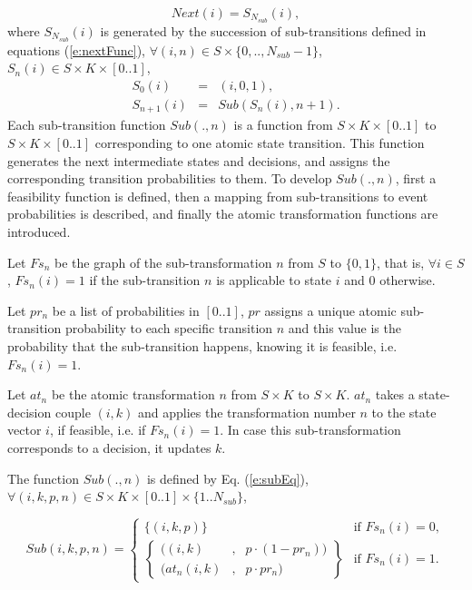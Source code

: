 \documentclass[letterpaper]{article}
\begin{document}
\begin{equation} \label{e:nextFunc0}
Next(i) = S_{N_{sub}}(i),
\end{equation}
where $S_{N_{sub}}(i)$ is generated by the succession of sub-transitions defined in equations (\ref{e:nextFunc}), $\forall (i,n) \in S \times \{0,..,N_{sub}-1\}$, $S_n(i)  \in S \times K \times [0..1]$,
\begin{equation}
\begin{array}{rcl}
S_0(i) &=& (i,0,1)\label{e:nextFunc},\\
S_{n+1}(i) &=& Sub(S_n(i),n+1).
\end{array}
\end{equation}
Each sub-transition function $Sub(.,n)$ is a function from $S \times K \times [0..1]$ to $S \times K \times [0..1]$ corresponding to one atomic 
state transition. This function generates the next intermediate states and decisions, and assigns the corresponding transition probabilities to them. To develop $Sub(.,n)$, first a feasibility function is defined, then a mapping from sub-transitions to event probabilities is described, and finally the atomic transformation functions are introduced.

Let $Fs_n$ be the graph of the sub-transformation $n$ from $S$ to $\{0,1\}$, that is, $\forall i \in S$, $Fs_n(i) = 1$ if the 
sub-transition $n$ is applicable to state $i$ and $0$ otherwise.

Let $pr_n$ be a list of probabilities in $[0..1]$, $pr$ assigns a unique atomic sub-transition probability to each specific transition $n$ and
 this value is the probability that the sub-transition happens, knowing it is feasible, i.e. $Fs_n(i) = 1$.

Let $at_n$ be the atomic transformation $n$ from $S \times K$ to $S \times K$. $at_n$ takes a state-decision couple $(i,k)$ 
and applies the transformation number $n$ to the state vector $i$, if feasible, i.e. if $Fs_n(i) = 1$. 
In case this sub-transformation corresponds to a decision, it updates $k$.

The function $Sub(.,n)$ is defined by Eq. (\ref{e:subEq}), $\forall (i,k,p,n) \in S \times K \times [0..1] \times \{1..N_{sub}\}$,

\begin{equation} \label{e:subEq}
Sub(i,k,p,n)=
\begin{cases}
\{ (i,k,p) \}& \text{if $Fs_n(i) = 0$},\\
\begin{Bmatrix} ( (i , k) &,& p\cdot(1-pr_n))\\ (at_n(i , k) &,& p \cdot pr_n) \end{Bmatrix} & \text{if $Fs_n(i) = 1$}.
\end{cases}
\end{equation}
\end{document}
